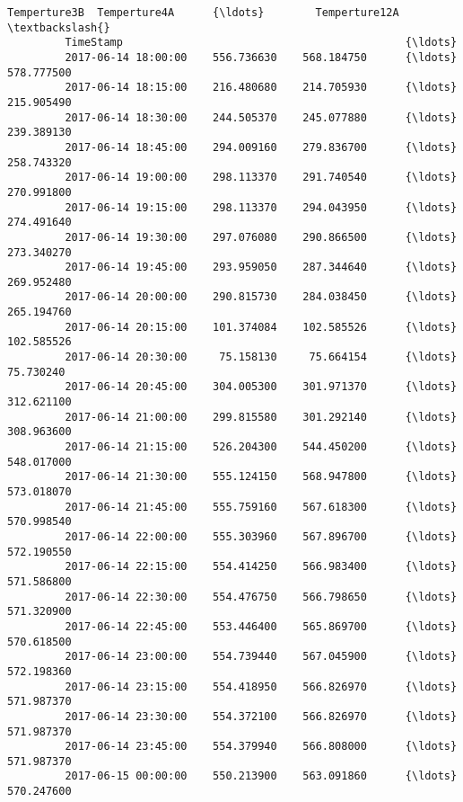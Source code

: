 \documentclass[11pt]{article}
\begin{document}
\begin{Verbatim}[commandchars=\\\{\}]
                              Temperture3B  Temperture4A      {\ldots}        Temperture12A  \textbackslash{}
         TimeStamp                                            {\ldots}                        
         2017-06-14 18:00:00    556.736630    568.184750      {\ldots}           578.777500   
         2017-06-14 18:15:00    216.480680    214.705930      {\ldots}           215.905490   
         2017-06-14 18:30:00    244.505370    245.077880      {\ldots}           239.389130   
         2017-06-14 18:45:00    294.009160    279.836700      {\ldots}           258.743320   
         2017-06-14 19:00:00    298.113370    291.740540      {\ldots}           270.991800   
         2017-06-14 19:15:00    298.113370    294.043950      {\ldots}           274.491640   
         2017-06-14 19:30:00    297.076080    290.866500      {\ldots}           273.340270   
         2017-06-14 19:45:00    293.959050    287.344640      {\ldots}           269.952480   
         2017-06-14 20:00:00    290.815730    284.038450      {\ldots}           265.194760   
         2017-06-14 20:15:00    101.374084    102.585526      {\ldots}           102.585526   
         2017-06-14 20:30:00     75.158130     75.664154      {\ldots}            75.730240   
         2017-06-14 20:45:00    304.005300    301.971370      {\ldots}           312.621100   
         2017-06-14 21:00:00    299.815580    301.292140      {\ldots}           308.963600   
         2017-06-14 21:15:00    526.204300    544.450200      {\ldots}           548.017000   
         2017-06-14 21:30:00    555.124150    568.947800      {\ldots}           573.018070   
         2017-06-14 21:45:00    555.759160    567.618300      {\ldots}           570.998540   
         2017-06-14 22:00:00    555.303960    567.896700      {\ldots}           572.190550   
         2017-06-14 22:15:00    554.414250    566.983400      {\ldots}           571.586800   
         2017-06-14 22:30:00    554.476750    566.798650      {\ldots}           571.320900   
         2017-06-14 22:45:00    553.446400    565.869700      {\ldots}           570.618500   
         2017-06-14 23:00:00    554.739440    567.045900      {\ldots}           572.198360   
         2017-06-14 23:15:00    554.418950    566.826970      {\ldots}           571.987370   
         2017-06-14 23:30:00    554.372100    566.826970      {\ldots}           571.987370   
         2017-06-14 23:45:00    554.379940    566.808000      {\ldots}           571.987370   
         2017-06-15 00:00:00    550.213900    563.091860      {\ldots}           570.247600   
         

\end{Verbatim}
\end{document}
